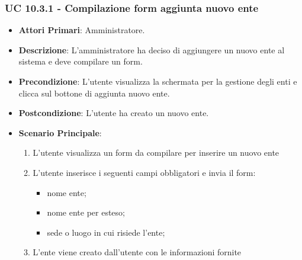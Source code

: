 			\subsubsection{UC 10.3.1 - Compilazione form aggiunta nuovo ente}
			\begin{itemize}
				\item \textbf{Attori Primari}: Amministratore.
				\item \textbf{Descrizione}: L'amministratore ha deciso di aggiungere un nuovo ente al sistema e deve compilare un form.
				\item \textbf{Precondizione}: L'utente visualizza la schermata per la gestione degli enti e clicca sul bottone di aggiunta nuovo ente.
				\item \textbf{Postcondizione}: L'utente ha creato un nuovo ente.
				\item \textbf{Scenario Principale}:
				\begin{enumerate}
					\item{L'utente visualizza un form da compilare per inserire un nuovo ente}
					\item{L'utente inserisce i seguenti campi obbligatori e invia il form:}
					\begin{itemize}
						\item nome ente;
						\item nome ente per esteso;
						\item sede o luogo in cui risiede l'ente;
					\end{itemize}
					\item{L'ente viene creato dall'utente con le informazioni fornite}
				\end{enumerate}	
			\end{itemize}			

